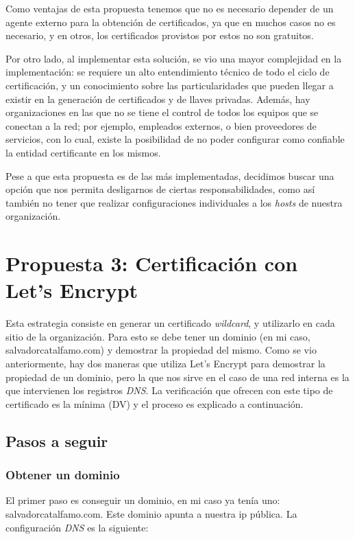 Como ventajas de esta propuesta tenemos que no es necesario depender de un 
agente externo para la obtención de certificados, ya que en muchos casos 
no es necesario, y en otros, los certificados provistos por estos no son 
gratuitos. 

Por otro lado, al implementar esta solución, se vio una mayor complejidad 
en la implementación: se requiere un alto entendimiento técnico de todo el 
ciclo de certificación, y un conocimiento sobre las particularidades que 
pueden llegar a existir en la generación de certificados y de llaves privadas. 
Además, hay organizaciones en las que no se tiene el control de todos 
los equipos que se conectan a la red; por ejemplo, empleados externos, 
o bien proveedores de servicios, con lo cual, existe la posibilidad de no 
poder configurar como confiable la entidad certificante en los 
mismos.

Pese a que esta propuesta es de las más implementadas, decidimos buscar 
una opción que nos permita desligarnos de ciertas responsabilidades, 
como así también no tener que realizar configuraciones individuales 
a los \emph{hosts} de nuestra organización.

\section{Propuesta 3: Certificación con Let's Encrypt}
Esta estrategia consiste en generar un certificado \emph{wildcard}, y utilizarlo en cada sitio de la organización.
Para esto se debe tener un dominio (en mi caso, salvadorcatalfamo.com) y demostrar la propiedad 
del mismo. Como se vio anteriormente, hay dos maneras que utiliza Let's Encrypt para demostrar la propiedad 
de un dominio, pero la que nos sirve en el caso de una red interna es la que intervienen los registros \emph{DNS}. 
La verificación que ofrecen con este tipo de certificado es la mínima (DV) y el proceso es explicado a 
continuación.


\subsection{Pasos a seguir}
\subsubsection*{Obtener un dominio}
El primer paso es conseguir un dominio, en mi caso ya tenía uno:
salvadorcatalfamo.com. Este dominio apunta a nuestra ip pública. La configuración \emph{DNS}
es la siguiente:  


